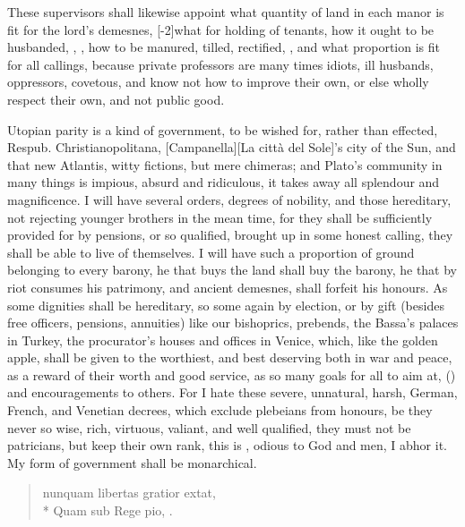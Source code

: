 These supervisors shall likewise appoint what quantity of land in each
manor is fit for the lord's demesnes, [-2\baselineskip]what for holding of tenants,
how it ought to be husbanded, , , how to be manured, tilled, rectified, , and what proportion is fit for all callings, because
private professors are many times idiots, ill husbands, oppressors,
covetous, and know not how to improve their own, or else wholly respect
their own, and not public good.

Utopian parity is a kind of government, to be wished for, rather
than effected, Respub. Christianopolitana, [Campanella][\textitalian{La città del Sole}]'s city of the
Sun, and that new Atlantis, witty fictions, but mere chimeras; and
Plato's community in many things is impious, absurd and ridiculous, it
takes away all splendour and magnificence. I will have several orders,
degrees of nobility, and those hereditary, not rejecting younger
brothers in the mean time, for they shall be sufficiently provided for
by pensions, or so qualified, brought up in some honest calling, they
shall be able to live of themselves. I will have such a proportion of
ground belonging to every barony, he that buys the land shall buy the
barony, he that by riot consumes his patrimony, and ancient demesnes,
shall forfeit his honours. As some dignities shall be hereditary,
so some again by election, or by gift (besides free officers, pensions,
annuities) like our bishoprics, prebends, the Bassa's palaces in
Turkey, the procurator's houses and offices in Venice, which, like
the golden apple, shall be given to the worthiest, and best deserving
both in war and peace, as a reward of their worth and good service, as
so many goals for all to aim at, () and encouragements
to others. For I hate these severe, unnatural, harsh, German, French,
and Venetian decrees, which exclude plebeians from honours, be they
never so wise, rich, virtuous, valiant, and well qualified, they must
not be patricians, but keep their own rank, this is , odious to God and men, I abhor it. My form of government shall
be monarchical.
%
\begin{verse}
\textlatin{nunquam libertas gratior extat,}\\*
\textlatin{Quam sub Rege pio, \etc.}
\end{verse}

